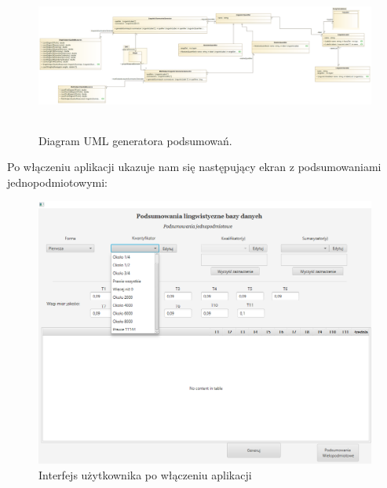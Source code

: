 \documentclass{classrep}
\begin{document}
\begin{figure}[H]
    \centering
    \includegraphics[width=14cm, height=5cm]{generator.png}
    \caption{Diagram UML generatora podsumowań.}
    \label{rysunek:generator}
\end{figure}

Po włączeniu aplikacji ukazuje nam się następujący ekran z podsumowaniami jednopodmiotowymi:
\begin{figure}[H]
    \centering
    \includegraphics[width=14cm]{gui.png}
    \caption{Interfejs użytkownika po włączeniu aplikacji}
    \label{rysunek:gui}
\end{figure}
\end{document}
